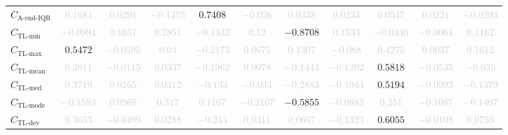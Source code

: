 \documentclass{standalone}
\newcommand{\lastiqrname}{\text{A-end-IQR}}
\newcommand{\lastiqr}{C_{\lastiqrname}}
\newcommand{\tlminname}{\text{TL-min}}
\newcommand{\tlmin}{C_{\tlminname}}
\newcommand{\tlavgname}{\text{TL-mean}}
\newcommand{\tlavg}{C_{\tlavgname}}
\newcommand{\tlmaxname}{\text{TL-max}}
\newcommand{\tlmax}{C_{\tlmaxname}}
\newcommand{\tlmedname}{\text{TL-med}}
\newcommand{\tlmed}{C_{\tlmedname}}
\newcommand{\tlmodename}{\text{TL-mode}}
\newcommand{\tlmode}{C_{\tlmodename}}
\newcommand{\tldevname}{\text{TL-dev}}
\newcommand{\tldev}{C_{\tldevname}}
\begin{document}
\begin{tabular}{lcccccccccc}
$\lastiqr$ & \textcolor{lightgray}{$0.1684$} & \textcolor{lightgray}{$0.0291$} & \textcolor{lightgray}{$-0.1375$} & $0.7408$ & \textcolor{lightgray}{$-0.026$} & \textcolor{lightgray}{$0.0338$} & \textcolor{lightgray}{$0.0233$} & \textcolor{lightgray}{$0.0547$} & \textcolor{lightgray}{$0.0221$} & \textcolor{lightgray}{$-0.0293$} \\ 
$\tlmin$ & \textcolor{lightgray}{$-0.0994$} & \textcolor{lightgray}{$0.1651$} & \textcolor{lightgray}{$0.2851$} & \textcolor{lightgray}{$-0.1432$} & \textcolor{lightgray}{$0.12$} & $-0.8708$ & \textcolor{lightgray}{$0.1533$} & \textcolor{lightgray}{$-0.0446$} & \textcolor{lightgray}{$-0.0064$} & \textcolor{lightgray}{$0.1162$} \\ 
$\tlmax$ & $0.5472$ & \textcolor{lightgray}{$-0.0595$} & \textcolor{lightgray}{$0.04$} & \textcolor{lightgray}{$-0.2173$} & \textcolor{lightgray}{$0.0675$} & \textcolor{lightgray}{$0.1307$} & \textcolor{lightgray}{$-0.088$} & \textcolor{lightgray}{$0.4275$} & \textcolor{lightgray}{$0.0037$} & \textcolor{lightgray}{$0.1612$} \\ 
$\tlavg$ & \textcolor{lightgray}{$0.3811$} & \textcolor{lightgray}{$-0.0115$} & \textcolor{lightgray}{$0.0337$} & \textcolor{lightgray}{$-0.1962$} & \textcolor{lightgray}{$0.0078$} & \textcolor{lightgray}{$-0.1444$} & \textcolor{lightgray}{$-0.1202$} & $0.5818$ & \textcolor{lightgray}{$-0.0535$} & \textcolor{lightgray}{$-0.035$} \\ 
$\tlmed$ & \textcolor{lightgray}{$0.3719$} & \textcolor{lightgray}{$0.0165$} & \textcolor{lightgray}{$0.0312$} & \textcolor{lightgray}{$-0.133$} & \textcolor{lightgray}{$-0.034$} & \textcolor{lightgray}{$-0.2883$} & \textcolor{lightgray}{$-0.1044$} & $0.5194$ & \textcolor{lightgray}{$-0.0993$} & \textcolor{lightgray}{$-0.1379$} \\ 
$\tlmode$ & \textcolor{lightgray}{$-0.1583$} & \textcolor{lightgray}{$0.0968$} & \textcolor{lightgray}{$0.317$} & \textcolor{lightgray}{$0.1167$} & \textcolor{lightgray}{$-0.2167$} & $-0.5855$ & \textcolor{lightgray}{$-0.0883$} & \textcolor{lightgray}{$0.251$} & \textcolor{lightgray}{$-0.1087$} & \textcolor{lightgray}{$-0.1407$} \\ 
$\tldev$ & \textcolor{lightgray}{$0.3653$} & \textcolor{lightgray}{$-0.0499$} & \textcolor{lightgray}{$0.0288$} & \textcolor{lightgray}{$-0.244$} & \textcolor{lightgray}{$0.0311$} & \textcolor{lightgray}{$0.0667$} & \textcolor{lightgray}{$-0.1323$} & $0.6055$ & \textcolor{lightgray}{$-0.0108$} & \textcolor{lightgray}{$0.0755$} \\ 

\end{tabular}
\end{document}
